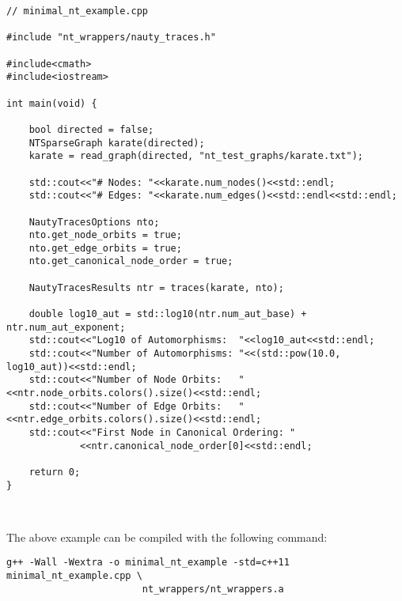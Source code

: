 \documentclass{article}
\begin{document}
\begin{verbatim}
// minimal_nt_example.cpp

#include "nt_wrappers/nauty_traces.h"

#include<cmath>
#include<iostream>

int main(void) {

    bool directed = false;
    NTSparseGraph karate(directed);
    karate = read_graph(directed, "nt_test_graphs/karate.txt");

    std::cout<<"# Nodes: "<<karate.num_nodes()<<std::endl;
    std::cout<<"# Edges: "<<karate.num_edges()<<std::endl<<std::endl;

    NautyTracesOptions nto;
    nto.get_node_orbits = true;
    nto.get_edge_orbits = true;
    nto.get_canonical_node_order = true;
    
    NautyTracesResults ntr = traces(karate, nto);
    
    double log10_aut = std::log10(ntr.num_aut_base) + ntr.num_aut_exponent;
    std::cout<<"Log10 of Automorphisms:  "<<log10_aut<<std::endl;
    std::cout<<"Number of Automorphisms: "<<(std::pow(10.0, log10_aut))<<std::endl;
    std::cout<<"Number of Node Orbits:   "<<ntr.node_orbits.colors().size()<<std::endl;
    std::cout<<"Number of Edge Orbits:   "<<ntr.edge_orbits.colors().size()<<std::endl;
    std::cout<<"First Node in Canonical Ordering: "
             <<ntr.canonical_node_order[0]<<std::endl;

    return 0;
}
\end{verbatim}

\ 

The above example can be compiled with the following command:

\begin{verbatim}
g++ -Wall -Wextra -o minimal_nt_example -std=c++11 minimal_nt_example.cpp \
                        nt_wrappers/nt_wrappers.a
\end{verbatim}

% 
% 




\end{document}
